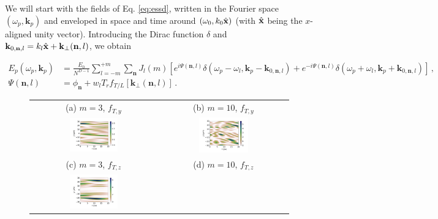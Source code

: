 \documentclass[
 reprint,
 amsmath,amssymb,
 aps,
]{revtex4-1}
\begin{document}
We will start with the fields of Eq. \eqref{eq:essd}, written in the Fourier space $(\omega_p,\mathbf{k}_p)$ and enveloped in space and time around $(\omega_0,k_0\Hat{\mathbf{x}} )$ (with $\Hat{\mathbf{x}}$ being the $x$-aligned unity vector).  Introducing the Dirac function $\delta$ and $\mathbf{k}_{0,\mathbf{n},l}=k_l\Hat{\mathbf{x}} + \mathbf{k}_\perp(\mathbf{n},l)$, we obtain
\begin{widetext}
\begin{align}
    E_p(\omega_p,\mathbf{k}_p)& =\frac{E_0}{N^{D-1}}   \sum_{l=-m}^{+m}  \sum_{\mathbf{n}}^{}   J_l(m) 
    [ e^{i \Psi(\mathbf{n},l)  }    \delta(\omega_p-\omega_l, \mathbf{k}_p-\mathbf{k}_{0,\mathbf{n},l})    +
     e^{-i \Psi(\mathbf{n},l)  }   \delta(\omega_p+\omega_l, \mathbf{k}_p+\mathbf{k}_{0,\mathbf{n},l}) ]
    \, , \label{eq:essdwk}  \\
    \Psi(\mathbf{n},l) &= \phi_{\mathbf{n}}  + w_l T_{r} f_{T/L}[\mathbf{k}_\perp(\mathbf{n},l)] \, .\label{eq:essdwk_psi} 
\end{align}
\begin{figure}
    \centering
    \begin{tabular}{cc}
        (a) $m=3$, $f_{T,y}$ &  (b) $m=10$, $f_{T,y}$ \\
            \includegraphics[width=0.4\textwidth]{ESSD_yt_m3.png}
         &  \includegraphics[width=0.4\textwidth]{ESSD_yt_m10.png} \\
         (c) $m=3$, $f_{T,z}$ &  (d) $m=10$, $f_{T,z}$   \\
            \includegraphics[width=0.4\textwidth]{ESSD_yt_m3_ft0.png}

\end{tabular}
\end{figure}
\end{widetext}
\end{document}
